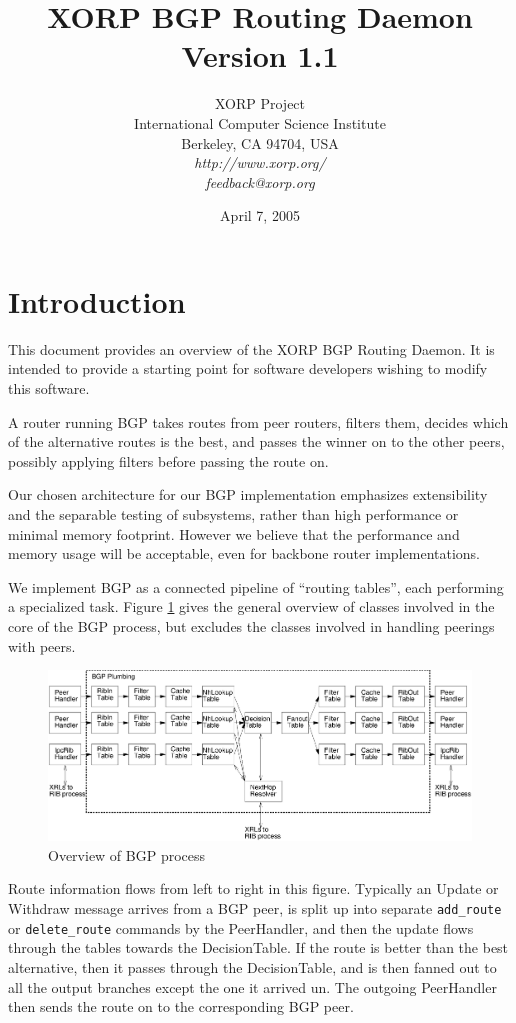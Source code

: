\documentclass[11pt]{article}
\title{XORP BGP Routing Daemon \\
\vspace{1ex}
Version 1.1}
\author{ XORP Project					\\
	 International Computer Science Institute	\\
	 Berkeley, CA 94704, USA			\\
         {\it http://www.xorp.org/}			\\
	 {\it feedback@xorp.org}
}
\date{April 7, 2005}
\begin{document}
\maketitle                            
\section{Introduction}
This document provides an overview of the XORP BGP Routing Daemon.  It
is intended to provide a starting point for software developers
wishing to modify this software.

A router running BGP takes routes from peer routers, filters them,
decides which of the alternative routes is the best, and passes the
winner on to the other peers, possibly applying filters before passing
the route on.

Our chosen architecture for our BGP implementation emphasizes
extensibility and the separable testing of subsystems, rather than
high performance or minimal memory footprint.  However we believe that
the performance and memory usage will be acceptable, even for backbone
router implementations.

We implement BGP as a connected pipeline of ``routing tables'', each
performing a specialized task.  Figure \ref{overview} gives the
general overview of classes involved in the core of the BGP process,
but excludes the classes involved in handling peerings with peers.
\begin{figure}[htb]
\centerline{\includegraphics[width=1.0\textwidth]{figs/overview}}
\vspace{.05in}
\caption{\label{overview}Overview of BGP process}
\end{figure}
Route information flows from left to right in this figure.  Typically
an Update or Withdraw message arrives from a BGP peer, is split up
into separate {\tt add\_route} or {\tt delete\_route} commands by the PeerHandler,
and then the update flows through the tables towards the
DecisionTable.  If the route is better than the best alternative, then
it passes through the DecisionTable, and is then fanned out to all the
output branches except the one it arrived un.  The outgoing
PeerHandler then sends the route on to the corresponding BGP peer.
\end{document}

